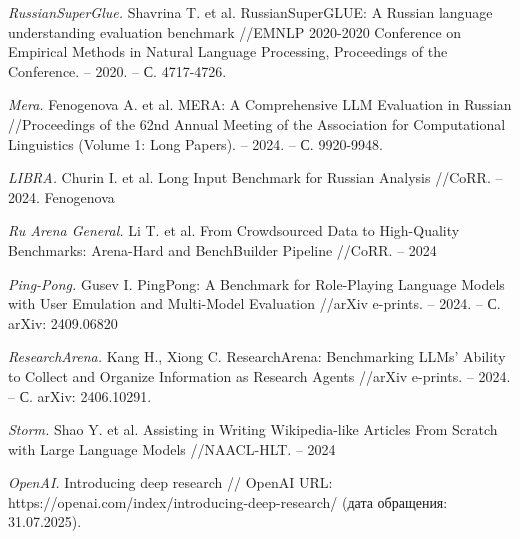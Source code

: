 \documentclass{article}
\theoremstyle{definition}
\theoremstyle{plain}
\begin{document}
\begin{thebibliography}{99}

\textit{RussianSuperGlue.}
Shavrina T. et al. RussianSuperGLUE: A Russian language understanding evaluation benchmark //EMNLP 2020-2020 Conference on Empirical Methods in Natural Language Processing, Proceedings of the Conference. – 2020. – С. 4717-4726.

\textit{Mera.}
Fenogenova A. et al. MERA: A Comprehensive LLM Evaluation in Russian //Proceedings of the 62nd Annual Meeting of the Association for Computational Linguistics (Volume 1: Long Papers). – 2024. – С. 9920-9948.

\textit{LIBRA.}
Churin I. et al. Long Input Benchmark for Russian Analysis //CoRR. – 2024. Fenogenova 

\textit{Ru Arena General.}
Li T. et al. From Crowdsourced Data to High-Quality Benchmarks: Arena-Hard and BenchBuilder Pipeline //CoRR. – 2024

\textit{Ping-Pong.}
Gusev I. PingPong: A Benchmark for Role-Playing Language Models with User Emulation and Multi-Model Evaluation //arXiv e-prints. – 2024. – С. arXiv: 2409.06820

\textit{ResearchArena.}
Kang H., Xiong C. ResearchArena: Benchmarking LLMs' Ability to Collect and Organize Information as Research Agents //arXiv e-prints. – 2024. – С. arXiv: 2406.10291.

\textit{Storm.}
Shao Y. et al. Assisting in Writing Wikipedia-like Articles From Scratch with Large Language Models //NAACL-HLT. – 2024

\textit{OpenAI.}
Introducing deep research // OpenAI URL: https://openai.com/index/introducing-deep-research/ (дата обращения: 31.07.2025).


\end{thebibliography}

\renewcommand\refname{References}
\end{document}
